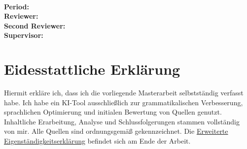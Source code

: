 \newcommand{\HRule}[2]{\noindent\rule[#1]{\linewidth}{#2}} %
\newcommand{\vlinespace}[1]{\vspace*{#1\baselineskip}} %
\newcommand{\titleemph}[1]{\textbf{#1}} %

\begin{titlepage}
        \centering \hslogo
	\centering
	\Large
	\vfill
   \thesistype \\
   \huge
   \textbf{\thesistitle} \\
   \vlinespace{2}
   \Large
   \studentname
   \vlinespace{3}

   \vlinespace{2}
   \studentcourse \\
   \thesisfaculty\\
	\hsname\\
   \thesissemester \\

   \vlinespace{2}

   \vfill
   \raggedright
   \large
   \titleemph{Period:} \thesisperiod \\ %
   \titleemph{Reviewer:} \thesisprofone \\
   \titleemph{Second Reviewer:} \thesisproftwo \\ %
   
   \titleemph{Supervisor:} \companysupervisor 
\end{titlepage}



\chapter*{Eidesstattliche Erklärung}

Hiermit erkläre ich, dass ich die vorliegende Masterarbeit selbstständig verfasst habe.
Ich habe ein KI-Tool ausschließlich zur grammatikalischen Verbesserung, sprachlichen Optimierung und initialen Bewertung von Quellen genutzt.
Inhaltliche Erarbeitung, Analyse und Schlussfolgerungen stammen vollständig von mir.
Alle Quellen sind ordnungsgemäß gekennzeichnet.
Die \hyperref[sec:extended_doi]{Erweiterte Eigenständigkeitserklärung} befindet sich am Ende der Arbeit.

